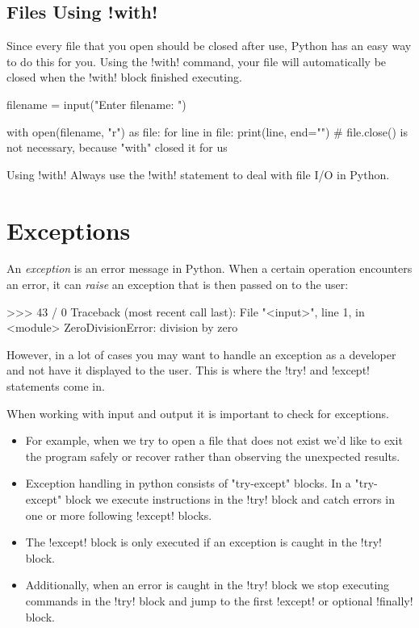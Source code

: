 \documentclass[11pt]{cselabheader}
\begin{document}
\subsection{Files Using \protect\pythoninline!with!}
Since every file that you open should be closed after use, Python has an easy
way to do this for you. Using the \pythoninline!with! command, your file will
automatically be closed when the \pythoninline!with! block finished executing.

\begin{python3code}
filename = input("Enter filename: ")

with open(filename, "r") as file:
    for line in file:
        print(line, end="")
# file.close() is not necessary, because "with" closed it for us
\end{python3code}

\begin{warningbox}{Using \protect\pythoninline!with!}
  Always use the \pythoninline!with! statement to deal with file I/O in Python.
\end{warningbox}

\pagebreak
\section{Exceptions}

An \emph{exception} is an error message in Python. When a certain operation
encounters an error, it can \emph{raise} an exception that is then passed on to
the user:

\begin{pyconcode}
>>> 43 / 0
Traceback (most recent call last):
  File "<input>", line 1, in <module>
ZeroDivisionError: division by zero
\end{pyconcode}

However, in a lot of cases you may want to handle an exception as a developer
and not have it displayed to the user. This is where the \pythoninline!try! and
\pythoninline!except! statements come in.

When working with input and output it is important to check for exceptions.  
\begin{itemize}
  \item For example, when we try to open a file that does not exist we'd like to
    exit the program safely or recover rather than observing the unexpected
    results.
  \item Exception handling in python consists of "try-except" blocks.  In a
    "try-except" block we execute instructions in the \pythoninline!try! block
    and catch errors in one or more following \pythoninline!except! blocks.  
  \item The \pythoninline!except! block is only executed if an exception is
    caught in the \pythoninline!try! block.
  \item Additionally, when an error is
    caught in the \pythoninline!try! block we stop executing commands in the
    \pythoninline!try!  block and jump to the first \pythoninline!except! or
    optional \pythoninline!finally! block.
\end{itemize}
\end{document}
